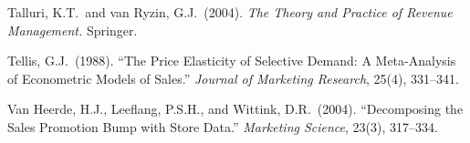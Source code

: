 \documentclass[12pt,a4paper]{article}
\begin{document}
\begin{enumerate}[label={[\arabic*]}, nosep, leftmargin=*]
\item Talluri, K.T.\ and van Ryzin, G.J.\ (2004). \textit{The Theory
and Practice of Revenue Management.} Springer.

\item Tellis, G.J.\ (1988). ``The Price Elasticity of Selective
Demand: A Meta-Analysis of Econometric Models of Sales.''
\textit{Journal of Marketing Research}, 25(4), 331--341.

\item Van Heerde, H.J., Leeflang, P.S.H., and Wittink, D.R.\
(2004). ``Decomposing the Sales Promotion Bump with Store Data.''
\textit{Marketing Science}, 23(3), 317--334.
\end{enumerate}
\end{document}
